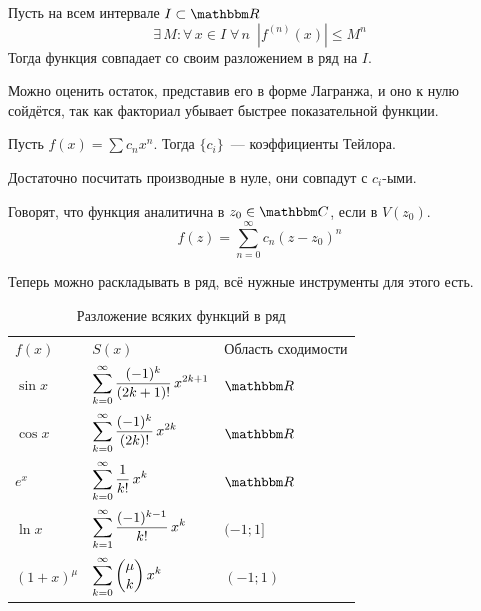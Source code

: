 \documentclass[12pt]{../../notes}
\begin{document}
\begin{lem}\label{lem:taylpowlim}
  Пусть на всем интервале $I\subset\R$ 
  \[
    \exists\, M\colon \forall\,x \in I \; \forall\,n \;\: |f^{(n)}(x)| \leqslant M^n 
  \]
  Тогда функция совпадает со своим разложением в ряд на $I$.
\end{lem}
\begin{itlproof}
  Можно оценить остаток, представив его в форме Лагранжа, и оно к нулю сойдётся, так как
  факториал убывает быстрее показательной функции.
\end{itlproof}

\begin{thrm}\label{thrm:powerseriesuniq}
  Пусть $f(x) = \sum c_n x^n$. Тогда $\{c_i\}$~--- коэффициенты Тейлора.
\end{thrm}
\begin{ittproof}
  Достаточно посчитать производные в нуле, они совпадут с $c_i$-ыми.
\end{ittproof}

\begin{defn}\label{defn:funanalit}
  Говорят, что функция аналитична в $z_0\in\C$, если в $V(z_0)$.
  \[
    f(z) = \sum_{n=0}^{\infty} c_n (z-z_0)^n
  \]
\end{defn}

Теперь можно раскладывать в ряд, всё нужные инструменты для этого есть.

\begin{table}[h]
  \caption{Разложение всяких функций в ряд}
  \label{tab:taylorseries}
  \vspace{1ex}
  \centering
  \begin{tabular}{lll}
    $f(x)$      & $S(x)$                                                  & Область сходимости \\[0.3em]
    $\sin x$    & $\displaystyle\sum_{k=0}^{\infty} \frac{(-1)^k}{(2k+1)!}\,x^{2k+1}$ & $\R$ \\[0.3em]
    $\cos x$    & $\displaystyle\sum_{k=0}^{\infty} \frac{(-1)^k}{(2k)!}\,x^{2k}$     & $\R$ \\[0.3em]
    $e^x$       & $\displaystyle\sum_{k=0}^{\infty} \frac{1}{k!}\,x^{k}$              & $\R$ \\[0.3em]
    $\ln x$     & $\displaystyle\sum_{k=1}^{\infty} \frac{(-1)^{k-1}}{k!}\,x^{k}$     & $(-1;1]$ \\[0.3em]
    $(1+x)^\mu$ & $\displaystyle\sum_{k=0}^{\infty} \binom{\mu}{k}\,x^{k}$            & $(-1;1)$
  \end{tabular}
\end{table}
\end{document}
